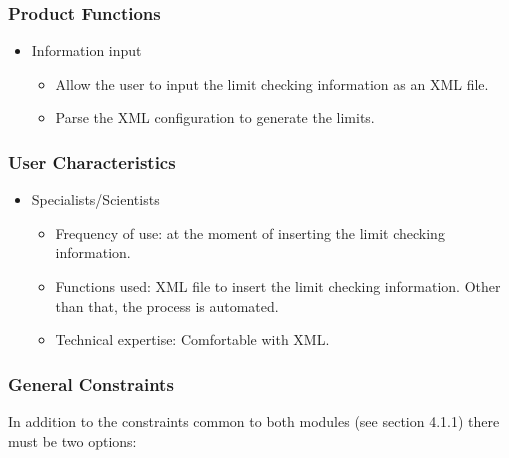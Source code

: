 \subsubsection{Product Functions}

\begin{itemize}
\item Information input
\begin{itemize}
\item Allow the user to input the limit checking information as an XML file.
\item Parse the XML configuration to generate the limits.
\end{itemize}


\end{itemize}

\subsubsection{User Characteristics}

\begin{itemize}
\item Specialists/Scientists
\begin{itemize}
\item Frequency of use: at the moment of inserting the limit checking information.
\item Functions used: XML file to insert the limit checking information. Other than that, the process is automated.
\item Technical expertise: Comfortable with XML.
\end{itemize}
\end{itemize}


\subsubsection{General Constraints}

In addition to the constraints common to both modules (see section 4.1.1) there must be two options:

